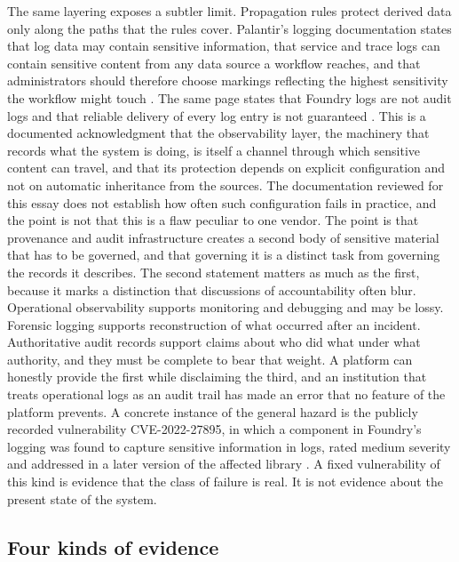 \documentclass[11pt]{article}
\theoremstyle{plain}
\theoremstyle{definition}
\theoremstyle{remark}
\begin{document}
The same layering exposes a subtler limit. Propagation rules protect derived data only along the paths that the rules cover. Palantir's logging documentation states that log data may contain sensitive information, that service and trace logs can contain sensitive content from any data source a workflow reaches, and that administrators should therefore choose markings reflecting the highest sensitivity the workflow might touch \cite{palantirLog}. The same page states that Foundry logs are not audit logs and that reliable delivery of every log entry is not guaranteed \cite{palantirLog}. This is a documented acknowledgment that the observability layer, the machinery that records what the system is doing, is itself a channel through which sensitive content can travel, and that its protection depends on explicit configuration and not on automatic inheritance from the sources. The documentation reviewed for this essay does not establish how often such configuration fails in practice, and the point is not that this is a flaw peculiar to one vendor. The point is that provenance and audit infrastructure creates a second body of sensitive material that has to be governed, and that governing it is a distinct task from governing the records it describes. The second statement matters as much as the first, because it marks a distinction that discussions of accountability often blur. Operational observability supports monitoring and debugging and may be lossy. Forensic logging supports reconstruction of what occurred after an incident. Authoritative audit records support claims about who did what under what authority, and they must be complete to bear that weight. A platform can honestly provide the first while disclaiming the third, and an institution that treats operational logs as an audit trail has made an error that no feature of the platform prevents. A concrete instance of the general hazard is the publicly recorded vulnerability CVE-2022-27895, in which a component in Foundry's logging was found to capture sensitive information in logs, rated medium severity and addressed in a later version of the affected library \cite{cve}. A fixed vulnerability of this kind is evidence that the class of failure is real. It is not evidence about the present state of the system.

\subsection{Four kinds of evidence}
\end{document}
